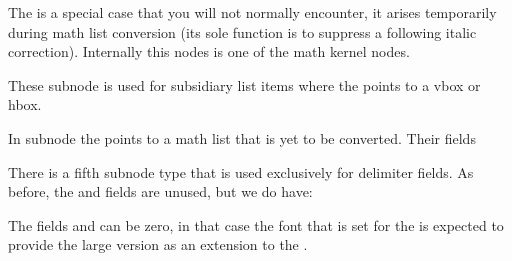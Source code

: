 

\stopsubsection

\startsubsection[title=mathtextchar]

The  is a special case that you will not normally encounter,
it arises temporarily during math list conversion (its sole function is to
suppress a following italic correction). Internally this nodes is one of the math
kernel nodes.



\stopsubsection

\startsubsection[title=subbox]

These  subnode is used for subsidiary list items where
the  points to a  vbox or hbox.



\stopsubsection

\startsubsection[title=submlist]

In  subnode the  points to a math list that is yet to
be converted. Their fields



\stopsubsection

\startsubsection[title={delimiter}]

There is a fifth subnode type that is used exclusively for delimiter fields. As
before, the  and  fields are unused, but we do have:


The fields  and  can be zero, in that case
the font that is set for the  is expected to provide the large
version as an extension to the .


\stopsubsection

